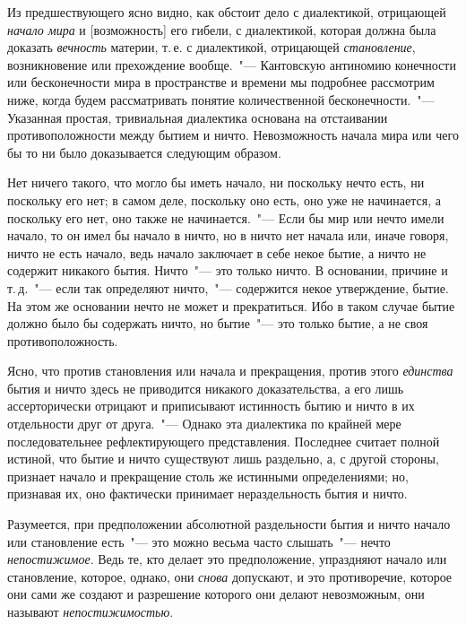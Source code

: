 Из предшествующего ясно видно, как обстоит дело с
диалектикой, отрицающей \emph{начало мира} и [возможность]
его гибели, с диалектикой, которая должна была доказать
\emph{вечность} материи, т.\,е. с диалектикой, отрицающей \emph{становление},
возникновение или прехождение вообще.~"---
Кантовскую антиномию конечности или бесконечности
мира в пространстве и времени мы подробнее рассмотрим
ниже, когда будем рассматривать понятие количественной
бесконечности.~"--- Указанная простая, тривиальная диалектика
основана на отстаивании противоположности
между бытием и ничто. Невозможность начала мира или
чего бы то ни было доказывается следующим образом.

Нет ничего такого, что могло бы иметь начало, ни поскольку
нечто есть, ни поскольку его нет; в самом деле,
поскольку оно есть, оно уже не начинается, а поскольку
его нет, оно также не начинается.~"--- Если бы мир или нечто
имели начало, то он имел бы начало в ничто, но в
ничто нет начала или, иначе говоря, ничто не есть начало,
ведь начало заключает в себе некое бытие, а ничто не
содержит никакого бытия. Ничто~"--- это только ничто.
В основании, причине и т.\,д.~"--- если так определяют ничто,~"---
содержится некое утверждение, бытие. На этом же
основании нечто не может и прекратиться. Ибо в таком
случае бытие должно было бы содержать ничто, но бытие~"---
это только бытие, а не своя противоположность.

Ясно, что против становления или начала и прекращения,
против этого \emph{единства} бытия и ничто здесь не
приводится никакого доказательства, а его лишь ассерторически
отрицают и приписывают истинность бытию и
ничто в их отдельности друг от друга.~"--- Однако эта диалектика
по крайней мере последовательнее рефлектирующего
представления. Последнее считает полной истиной,
что бытие и ничто существуют лишь раздельно, а, с
другой стороны, признает начало и прекращение столь
же истинными определениями; но, признавая их, оно
фактически принимает нераздельность бытия и ничто.

Разумеется, при предположении абсолютной раздельности
бытия и ничто начало или становление есть~"---
это можно весьма часто слышать~"--- нечто \emph{непостижимое}.
Ведь те, кто делает это предположение, упраздняют начало
или становление, которое, однако, они \emph{снова} допускают,
и это противоречие, которое они сами же создают
и разрешение которого они делают невозможным, они называют
\emph{непостижимостью}.

